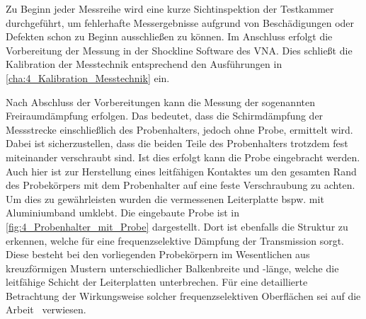 Zu Beginn jeder Messreihe wird eine kurze Sichtinspektion der Testkammer durchgeführt, um fehlerhafte Messergebnisse aufgrund von Beschädigungen oder Defekten schon zu Beginn ausschließen zu können. Im Anschluss erfolgt die Vorbereitung der Messung in der Shockline Software des VNA. Dies schließt die Kalibration der Messtechnik entsprechend den Ausführungen in \Abschnitt\ref{cha:4_Kalibration_Messtechnik} ein.
\par
\vspace{\linespace}
Nach Abschluss der Vorbereitungen kann die Messung der sogenannten Freiraumdämpfung erfolgen. Das bedeutet, dass die Schirmdämpfung der Messstrecke einschließlich des Probenhalters, jedoch ohne Probe, ermittelt wird. Dabei ist sicherzustellen, dass die beiden Teile des Probenhalters trotzdem fest miteinander verschraubt sind. Ist dies erfolgt kann die Probe eingebracht werden. Auch hier ist zur Herstellung eines leitfähigen Kontaktes um den gesamten Rand des Probekörpers mit dem Probenhalter auf eine feste Verschraubung zu achten. Um dies zu gewährleisten wurden die vermessenen Leiterplatte bspw. mit Aluminiumband umklebt. Die eingebaute Probe ist in \Abb\ref{fig:4_Probenhalter_mit_Probe} dargestellt. Dort ist ebenfalls die Struktur zu erkennen, welche für eine frequenzselektive Dämpfung der Transmission sorgt. Diese besteht bei den vorliegenden Probekörpern im Wesentlichen aus kreuzförmigen Mustern unterschiedlicher Balkenbreite und -länge, welche die leitfähige Schicht der Leiterplatten unterbrechen. Für eine detaillierte Betrachtung der Wirkungsweise solcher frequenzselektiven Oberflächen sei auf die Arbeit~\cite{FSS_Toedter_Diplomarbeit} verwiesen.
\par
\vspace{\linespace}


